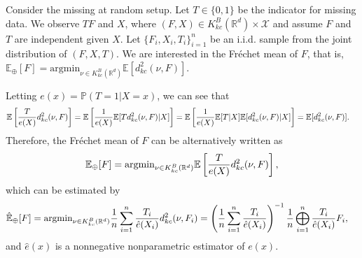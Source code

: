 \documentclass[11pt,reqno]{amsart}
\begin{document}
Consider the missing at random setup. Let $T \in \{0,1\}$ be the indicator for missing data. We observe $TF$ and $X$, where $(F,X) \in K_{kc}^B(\mathbb{R}^d) \times \mathcal{X}$ and assume $F$ and $T$ are independent given $X$. Let $\{F_i,X_i,T_i\}_{i=1}^n$ be an i.i.d. sample from the joint distribution of $(F,X,T)$. We are interested in the Fr\'echet mean of $F$, that is, $\mathbb{E}_\oplus[F] = \mathrm{argmin}_{\nu \in K_{kc}^B(\mathbb{R}^d)}\mathbb{E}[d_{kc}^2(\nu,F)]$.

Letting $e(x) = \mathbb{P}(T=1|X=x)$, we can see that 
\begin{align*}
\mathbb{E}\left[{T \over e(X)}d_{kc}^2(\nu,F)\right]
&= \mathbb{E}\left[{1 \over e(X)}\mathbb{E}[Td_{kc}^2(\nu,F)|X]\right]
= \mathbb{E}\left[{1 \over e(X)}\mathbb{E}[T|X]\mathbb{E}[d_{kc}^2(\nu,F)|X]\right]
= \mathbb{E}[d_{kc}^2(\nu,F)]. 
\end{align*}
Therefore, the Fr\'echet mean of $F$ can be alternatively written as 
\[
\mathbb{E}_\oplus[F] = \mathrm{argmin}_{\nu \in K_{kc}^B(\mathbb{R}^d)}\mathbb{E}\left[{T \over e(X)}d_{kc}^2(\nu,F)\right], 
\]
which can be estimated by 
\begin{align*}
\hat{\mathbb{E}}_\oplus[F] 
&= \mathrm{argmin}_{\nu \in K_{kc}^B(\mathbb{R}^d)}{1 \over n}\sum_{i=1}^n {T_i \over \hat{e}(X_i)}d_{kc}^2(\nu,F_i) = \left({1 \over n}\sum_{i=1}^n {T_i \over \hat{e}(X_i)}\right)^{-1}{1 \over n} \bigoplus_{i=1}^n {T_i \over \hat{e}(X_i)} F_i,
\end{align*}
and $\hat{e}(x)$ is a nonnegative nonparametric estimator of $e(x)$. 
\end{document}

